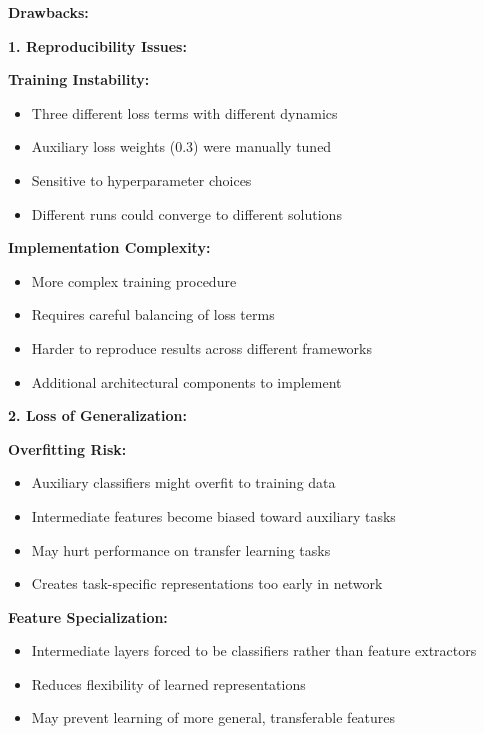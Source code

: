 \documentclass[12pt]{article}
\begin{document}
\begin{enumerate}[(a)]
{    \textbf{Drawbacks:}
    
    \textbf{1. Reproducibility Issues:}
    
    \textbf{Training Instability:}
    \begin{itemize}
        \item Three different loss terms with different dynamics
        \item Auxiliary loss weights (0.3) were manually tuned
        \item Sensitive to hyperparameter choices
        \item Different runs could converge to different solutions
    \end{itemize}
    
    \textbf{Implementation Complexity:}
    \begin{itemize}
        \item More complex training procedure
        \item Requires careful balancing of loss terms
        \item Harder to reproduce results across different frameworks
        \item Additional architectural components to implement
    \end{itemize}
    
    \textbf{2. Loss of Generalization:}
    
    \textbf{Overfitting Risk:}
    \begin{itemize}
        \item Auxiliary classifiers might overfit to training data
        \item Intermediate features become biased toward auxiliary tasks
        \item May hurt performance on transfer learning tasks
        \item Creates task-specific representations too early in network
    \end{itemize}
    
    \textbf{Feature Specialization:}
    \begin{itemize}
        \item Intermediate layers forced to be classifiers rather than feature extractors
        \item Reduces flexibility of learned representations
        \item May prevent learning of more general, transferable features
    \end{itemize}
    
}
\end{enumerate}
\end{document}
